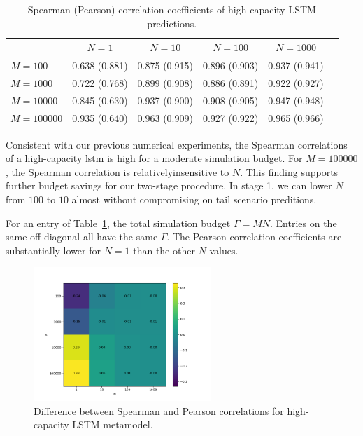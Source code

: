 \begin{table}[ht!]
    \small
    \centering
    \begin{tabular}{lccccc}
        \toprule
                           & $N=\num{1}$   & $N=\num{10}$  & $N=\num{100}$ & $N=\num{1000}$ \\
        \midrule
        $M = \num{100}$    & 0.638 (0.881) & 0.875 (0.915) & 0.896 (0.903) & 0.937 (0.941) \\
        $M = \num{1000}$   & 0.722 (0.768) & 0.899 (0.908) & 0.886 (0.891) & 0.922 (0.927) \\
        $M = \num{10000}$  & 0.845 (0.630) & 0.937 (0.900) & 0.908 (0.905) & 0.947 (0.948) \\
        $M = \num{100000}$ & 0.935 (0.640) & 0.963 (0.909) & 0.927 (0.922) & 0.965 (0.966) \\
        \bottomrule
    \end{tabular}
    \caption{Spearman (Pearson) correlation coefficients of high-capacity LSTM predictions.}
    \label{tab2:lstm_corr}
\end{table}

Consistent with our previous numerical experiments, the Spearman correlations of a high-capacity \gls{lstm} is high for a moderate simulation budget. 
For $M= \num{100000}$, the Spearman correlation is relativelyinsensitive to $N$.
This finding supports further budget savings for our two-stage procedure.
In stage 1, we can lower $N$ from $\num{100}$ to $\num{10}$ almost without compromising on tail scenario preditions. 

For an entry of Table~\ref{tab2:lstm_corr}, the total simulation budget $\Gamma = M N$. 
Entries on the same off-diagonal all have the same $\Gamma$.
The Pearson correlation coefficients are substantially lower for $N=\num{1}$ than the other $N$ values.

\begin{figure}
    \centering
    \includegraphics[width=0.6\textwidth]{./project2/figures/cor_heatmap.png}
    \caption{Difference between Spearman and Pearson correlations for high-capacity LSTM metamodel.}
    \label{fig2:cor-heatmap}
\end{figure}

